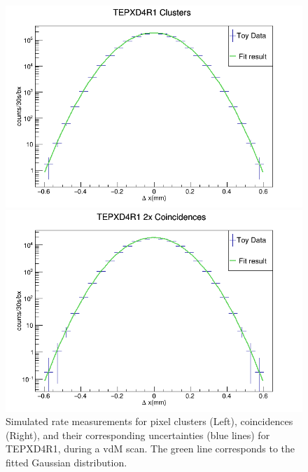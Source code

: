 \begin{center}
    \begin{figure}[H]
\begin{minipage}[b]{0.5\linewidth}
        \centering
        \includegraphics[scale=0.3]{Chapter4/plots/toy_cD4R1.png}
\end{minipage}
\begin{minipage}[b]{0.5\linewidth}
        \centering
        \includegraphics[scale=0.3]{Chapter4/plots/toy_2xD4R1.png}
\end{minipage}
    \caption[Simulated rate measurements of the vdM toy study for TEPXD4R1.]{Simulated rate measurements for pixel clusters (Left), coincidences (Right), and their corresponding uncertainties (blue lines) for TEPXD4R1, during a vdM scan. The green line corresponds to the fitted Gaussian distribution.}
    \label{ref2}
\end{figure}
\end{center}


